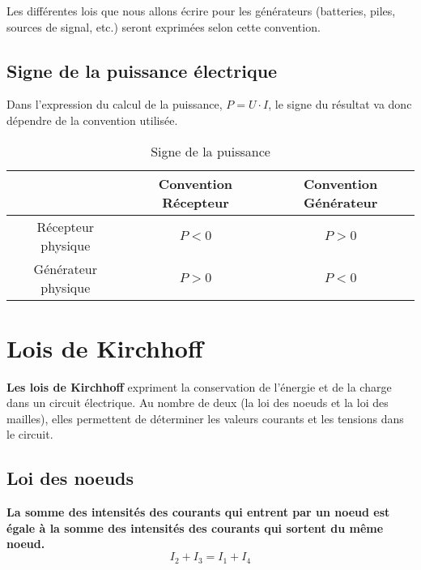 Les différentes lois que nous allons écrire pour les générateurs (batteries, piles, sources de signal, etc.) seront exprimées selon cette convention.

\subsection*{Signe de la puissance électrique}

Dans l'expression du calcul de la puissance, $P=U \cdot I$, le signe du résultat va donc dépendre de la convention utilisée.

\begin{table}[!h]
\begin{center}
\bgroup
\def\arraystretch{1.5}%
\begin{tabular}{|c|c|c|}
	\hline
	& \textbf{Convention Récepteur} & \textbf{Convention Générateur} \\
	\hline
	Récepteur physique  & $P<0$ & $P>0$ \\
	\hline
	Générateur physique & $P>0$ & $P<0$ \\
	\hline
\end{tabular}
\egroup
\end{center}
	\caption{ Signe de la puissance }
\end{table}

\section{Lois de Kirchhoff}
\textbf{Les lois de Kirchhoff} expriment la conservation de l'énergie et de la charge dans un circuit électrique. Au nombre de deux (la loi des noeuds et la loi des mailles), elles permettent de déterminer les valeurs courants et les tensions dans le circuit.

\subsection*{Loi des noeuds}
\vspace{0.5cm}
\begin{minipage}{3cm}
\begin{center}

\end{center}
\end{minipage}
\hspace{1cm}
\begin{minipage}{10cm} 
\textbf{La somme des intensités des courants qui entrent par un noeud est égale à la somme des intensités des courants qui sortent du même noeud.} \\
	$$ I_2 + I_3 = I_1 + I_4 $$
\end{minipage}\\

